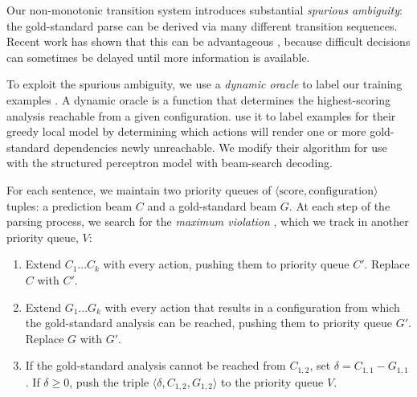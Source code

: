 \documentclass[11pt,letterpaper]{article}
\begin{document}

Our non-monotonic transition system introduces substantial \emph{spurious ambiguity}:
the gold-standard parse can be derived via many different transition sequences.
Recent work has shown that this can be advantageous
\citep{sartorio:13,honnibal:13,goldberg:12}, because difficult decisions can
sometimes be delayed until more information is available.

To exploit the spurious ambiguity, we use a \emph{dynamic oracle} to
label our training examples \citet{goldberg:12}.
A dynamic oracle is a function that determines the highest-scoring analysis
reachable from a given configuration.  \citet{goldberg:12} use it to
label examples for their greedy local model by determining which actions will
render one or more gold-standard dependencies newly unreachable.  We modify their
algorithm for use with the structured perceptron model with beam-search decoding.

For each sentence, we maintain two priority queues of
$\langle \mathrm{score}, \mathrm{configuration} \rangle$ tuples: a prediction
beam $C$ and a gold-standard beam $G$.
At each step of the parsing process, we search for the \emph{maximum violation}
\citep{huang:12}, which we track in another priority queue, $V$:

\begin{enumerate}
\itemsep0em
\item Extend $C_1...C_k$ with every action, pushing them to
      priority queue $C'$. Replace $C$ with $C'$.
\item Extend $G_1...G_k$ with every action that results in a
      configuration from which the gold-standard analysis can be reached, pushing
      them to priority queue $G'$. Replace $G$ with $G'$.
  \item If the gold-standard analysis cannot be reached from $C_{1,2}$, 
    set $\delta = C_{1,1} - G_{1,1}$. If $\delta \ge 0$, push the triple
    $\langle \delta, C_{1,2}, G_{1,2} \rangle$ to the priority queue $V$.
\end{enumerate}
\end{document}
